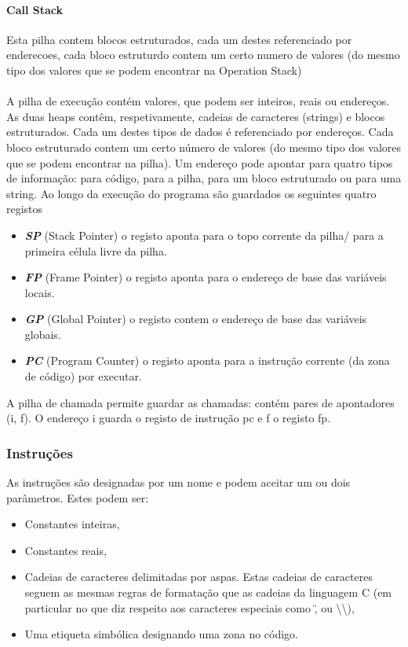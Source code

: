 \documentclass{report}
\begin{document}
\paragraph{\quad Call Stack}
Esta pilha contem blocos estruturados, cada um destes referenciado por enderecoes, cada bloco
estruturdo contem um certo numero de valores (do mesmo tipo dos valores que se podem encontrar na Operation Stack)
\\
\\
\null\quad A pilha de execução contém valores, que podem ser inteiros, reais ou endereços.
As duas heaps contêm, respetivamente, cadeias de caracteres (strings) e blocos estruturados.
Cada um destes tipos de dados é referenciado por endereços. Cada bloco
estruturado contem um certo número de valores (do mesmo tipo dos valores que se podem
encontrar na pilha).
Um endereço pode apontar para quatro tipos de informação: para código, para a
pilha, para um bloco estruturado ou para uma string.
Ao longo da execução do programa são guardados os seguintes quatro registos
\begin{itemize}
	\item \textit{\textbf{SP}} (Stack Pointer) o registo aponta para o topo corrente da pilha/ para a primeira célula livre da pilha.
	\item \textit{\textbf{FP}} (Frame Pointer) o registo aponta para o endereço de base das variáveis locais.
	\item \textit{\textbf{GP}} (Global Pointer) o registo contem o endereço de base das variáveis globais.
	\item \textit{\textbf{PC}} (Program Counter) o registo aponta para a instrução corrente (da zona de código) por executar.
\end{itemize}

A pilha de chamada permite guardar as chamadas: contém pares de apontadores
(i, f). O endereço i guarda o registo de instrução pc e f o registo fp.

\subsubsection{Instruções}

\quad As instruções são designadas por um nome e podem aceitar um ou dois parâmetros. Estes podem ser:
\begin{itemize}
\item Constantes inteiras,
\item Constantes reais,
\item Cadeias de caracteres delimitadas por aspas. Estas cadeias de caracteres seguem as
mesmas regras de formatação que as cadeias da linguagem C (em particular no que
diz respeito aos caracteres especiais como \", \n ou \textbackslash\textbackslash ),
\item Uma etiqueta simbólica designando uma zona no código.
\end{itemize}
\end{document}
